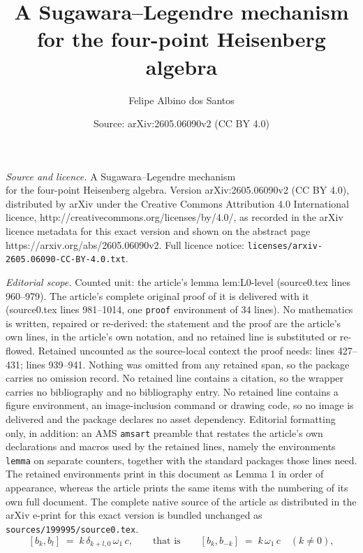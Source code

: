 \documentclass[10pt,a4paper]{amsart}
\title{A Sugawara--Legendre mechanism\\ for the four-point Heisenberg algebra}
\author{Felipe Albino dos Santos}
\date{Source: arXiv:2605.06090v2 (CC BY 4.0)}
\begin{document}
\maketitle

\noindent\emph{Source and licence.} A Sugawara--Legendre mechanism\\ for the four-point Heisenberg algebra. Version arXiv:2605.06090v2 (CC BY 4.0), distributed by arXiv under the Creative Commons Attribution 4.0 International licence, http://creativecommons.org/licenses/by/4.0/, as recorded in the arXiv licence metadata for this exact version and shown on the abstract page https://arxiv.org/abs/2605.06090v2. Full licence notice: \texttt{licenses/arxiv-2605.06090-CC-BY-4.0.txt}.\par\smallskip

\noindent\textit{Editorial scope.} Counted unit: the article's lemma lem:L0-level (source0.tex lines 960--979). The article's complete original proof of it is delivered with it (source0.tex lines 981--1014, one \texttt{proof} environment of 34 lines). No mathematics is written, repaired or re-derived: the statement and the proof are the article's own lines, in the article's own notation, and no retained line is substituted or re-flowed.  Retained uncounted as the source-local context the proof needs: lines 427--431; lines 939--941.  Nothing was omitted from any retained span, so the package carries no omission record.  No retained line contains a citation, so the wrapper carries no bibliography and no bibliography entry.  No retained line contains a figure environment, an image-inclusion command or drawing code, so no image is delivered and the package declares no asset dependency.  Editorial formatting only, in addition: an AMS \texttt{amsart} preamble that restates the article's own declarations and macros used by the retained lines, namely the environments \texttt{lemma} on separate counters, together with the standard packages those lines need.  The retained environments print in this document as Lemma 1 in order of appearance, whereas the article prints the same items with the numbering of its own full document.  The complete native source of the article as distributed in the arXiv e-print for this exact version is bundled unchanged as \texttt{sources/199995/source0.tex}.
\begin{equation}\label{eq:psi-r1}
  [b_k, b_l] \;=\; k\,\delta_{k+l,0}\, \omega_1 \, c,
  \qquad\text{that is}\qquad
  [b_k, b_{-k}] \;=\; k\,\omega_1\,c \quad (k \neq 0),
\end{equation}
\end{document}
